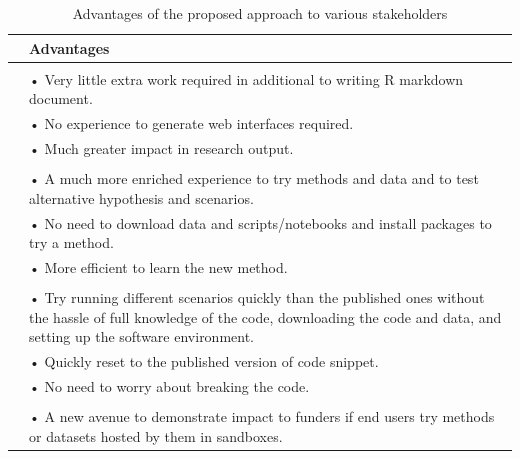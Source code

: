 \begin{Schunk}
\begin{table}

\caption{\label{tab:tb1-latex}Advantages of the proposed approach to various stakeholders}
\centering
\begin{tabular}[t]{>{\raggedright\arraybackslash}p{0.1em}>{\raggedright\arraybackslash}p{40em}}
\toprule
 & Advantages\\
\midrule
\addlinespace[0.3em]
\multicolumn{2}{l}{\textbf{Authors}}\\
\hspace{1em} & • Very little extra work required in additional to writing R markdown document.\\
\hspace{1em} & • No experience to generate web interfaces required.\\
\hspace{1em} & • Much greater impact in research output.\\
\midrule
\addlinespace[0.3em]
\multicolumn{2}{l}{\textbf{Other researchers (those wanting to try or compare the method)}}\\
\hspace{1em} & • A much more enriched experience to try methods and data and to test alternative hypothesis and scenarios.\\
\hspace{1em} & • No need to download data and scripts/notebooks and install packages to try a method.\\
\hspace{1em} & • More efficient to learn the new method.\\
\midrule
\addlinespace[0.3em]
\multicolumn{2}{l}{\textbf{Other researchers (those curious about the results)}}\\
\hspace{1em} & • Try running different scenarios quickly than the published ones without the hassle of full knowledge of the code, downloading the code and data, and setting up the software environment.\\
\hspace{1em} & • Quickly reset to the published version of code snippet.\\
\hspace{1em} & • No need to worry about breaking the code.\\
\midrule
\addlinespace[0.3em]
\multicolumn{2}{l}{\textbf{Data Centres}}\\
\hspace{1em} & • A new avenue to demonstrate impact to funders if end users try methods or datasets hosted by them in sandboxes.\\

\end{tabular}
\end{table}
\end{Schunk}
